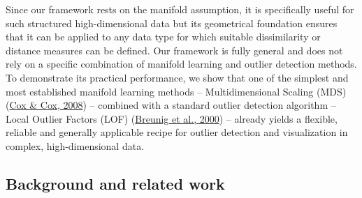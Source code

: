 \documentclass[
  10pt]{article}
\begin{document}
Since our framework rests on the manifold assumption, it is specifically useful for such structured high-dimensional data but its geometrical foundation ensures that it can be applied to any data type for which suitable dissimilarity or distance measures can be defined.
Our framework is fully general and does not rely on a specific combination of manifold learning and outlier detection methods. To demonstrate its practical performance, we show that one of the simplest and most established manifold learning methods -- Multidimensional Scaling (MDS) (\protect\hyperlink{ref-cox2008multidimensional}{Cox \& Cox, 2008}) -- combined with a standard outlier detection algorithm -- Local Outlier Factors (LOF) (\protect\hyperlink{ref-breunig2000lof}{Breunig et al., 2000}) -- already yields a flexible, reliable and generally applicable recipe for outlier detection and visualization in complex, high-dimensional data.

\hypertarget{sec:prelims:background}{%
\subsection{Background and related work}\label{sec:prelims:background}}
\end{document}
